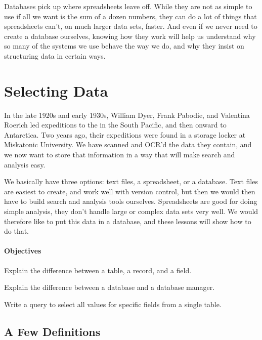 \documentclass{book}
\begin{document}
Databases pick up where spreadsheets leave off. While they are not as
simple to use if all we want is the sum of a dozen numbers, they can do
a lot of things that spreadsheets can't, on much larger data sets,
faster. And even if we never need to create a database ourselves,
knowing how they work will help us understand why so many of the systems
we use behave the way we do, and why they insist on structuring data in
certain ways.

\section{Selecting Data}

In the late 1920s and early 1930s, William Dyer, Frank Pabodie, and
Valentina Roerich led expeditions to the
 in the South Pacific, and then onward to Antarctica.
Two years ago, their expeditions were found in a storage locker at
Miskatonic University. We have scanned and OCR'd the data they contain,
and we now want to store that information in a way that will make search
and analysis easy.

We basically have three options: text files, a spreadsheet, or a
database. Text files are easiest to create, and work well with version
control, but then we would then have to build search and analysis tools
ourselves. Spreadsheets are good for doing simple analysis, they don't
handle large or complex data sets very well. We would therefore like to
put this data in a database, and these lessons will show how to do that.

\mbox{}\paragraph{Objectives}

\begin{swcitemize}
\item
  Explain the difference between a table, a record, and a field.
\item
  Explain the difference between a database and a database manager.
\item
  Write a query to select all values for specific fields from a single
  table.
\end{swcitemize}

\subsection{A Few Definitions}
\end{document}

